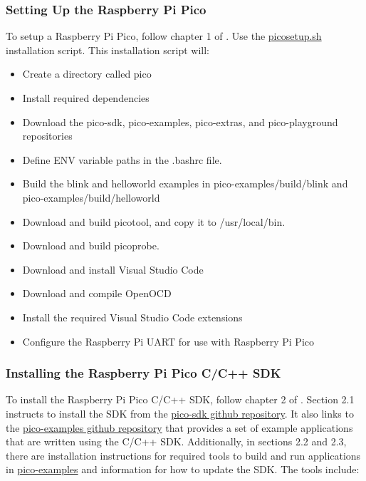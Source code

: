 {\subsubsection{Setting Up the Raspberry Pi Pico}
To setup a Raspberry Pi Pico, follow chapter 1 of \citePicoGetStart. Use the \href{https://raw.githubusercontent.com/raspberrypi/pico-setup/master/pico_setup.sh}{pico\textunderscore setup.sh} installation script. 
This installation script will:
\begin{itemize}
    \item Create a directory called pico
    \item Install required dependencies
    \item Download the pico-sdk, pico-examples, pico-extras, and pico-playground repositories
    \item Define ENV variable paths in the .bashrc file.
    \item Build the blink and hello\textunderscore world examples in pico-examples/build/blink and pico-examples/build/hello\textunderscore world
    \item Download and build picotool, and copy it to /usr/local/bin.
    \item Download and build picoprobe.
    \item Download and install Visual Studio Code
    \item Download and compile OpenOCD
    \item Install the required Visual Studio Code extensions
    \item Configure the Raspberry Pi UART for use with Raspberry Pi Pico
\end{itemize}

\subsubsection{Installing the Raspberry Pi Pico C/C++ SDK}
To install the Raspberry Pi Pico C/C++ SDK, follow chapter 2 of \citePicoGetStart. Section 2.1 instructs to install the SDK from the \href{https://github.com/raspberrypi/pico-sdk}{pico-sdk github repository}.
It also links to the \href{https://github.com/raspberrypi/pico-examples}{pico-examples github repository} that provides a set of example applications that are written using the C/C++ SDK.
Additionally, in sections 2.2 and 2.3, there are installation instructions for required tools to build and run applications in \href{https://github.com/raspberrypi/pico-examples}{pico-examples} and information for how to update the SDK. The tools include:

}
